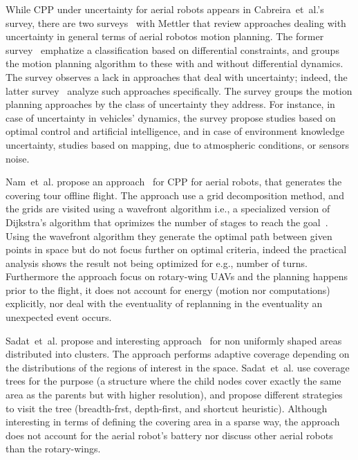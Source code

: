 While CPP under uncertainty for aerial robots appears in Cabreira~et~al.'s survey, there are two surveys~\citep{goerzen2010survey,dadkhah2012survey} with Mettler that review approaches dealing with uncertainty in general terms of aerial robotos motion planning. 
The former survey~\citep{goerzen2010survey} emphatize a classification based on differential constraints, and groups the motion planning algorithm to these with and without differential dynamics. The survey observes a lack in approaches that deal with uncertainty; indeed, the latter survey~\citep{dadkhah2012survey} analyze such approaches specifically. The survey groups the motion planning approaches by the class of uncertainty they address. For instance, in case of uncertainty in vehicles' dynamics, the survey propose studies based on optimal control and artificial intelligence, and in case of environment knowledge uncertainty, studies based on mapping, due to atmospheric conditions, or sensors noise. 

Nam~et~al. propose an approach~\citep{nam2016approach} for CPP for aerial robots, that generates the covering tour offline flight. The approach use a grid decomposition method, and the grids are visited using a wavefront algorithm i.e., a specialized version of Dijkstra's algorithm that oprimizes the number of stages to reach the goal~\citep{lavalle2006planning}. Using the wavefront algorithm they generate the optimal path between given points in space but do not focus further on optimal criteria, indeed the practical analysis shows the result not being optimized for e.g., number of turns. Furthermore the approach focus on rotary-wing UAVs and the planning happens prior to the flight, it does not account for energy (motion nor computations) explicitly, nor deal with the eventuality of replanning in the eventuality an unexpected event occurs.


Sadat~et~al. propose and interesting approach~\citep{sadat2014recursive} for non uniformly shaped areas distributed into clusters. The approach performs adaptive coverage depending on the distributions of the regions of interest in the space. Sadat~et~al. use coverage trees for the purpose (a structure where the child nodes cover exactly the same area as the parents but with higher resolution), and propose different strategies to visit the tree (breadth-frst, depth-first, and shortcut heuristic). Although interesting in terms of defining the covering area in a sparse way, the approach does not account for the aerial robot's battery nor discuss other aerial robots than the rotary-wings.


